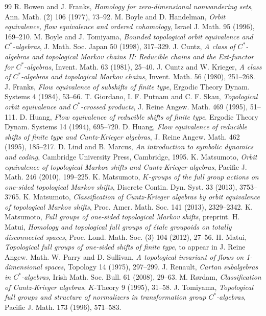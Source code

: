 \documentclass[11pt]{article}
\theoremstyle{definition}
\numberwithin{equation}{section}
\begin{document}
\begin{thebibliography}{99}
R. Bowen and J. Franks, 
\textit{Homology for zero-dimensional nonwandering sets}, 
Ann. Math. (2) 106 (1977), 73--92. 
M. Boyle and D. Handelman, 
\textit{Orbit equivalence, flow equivalence and ordered cohomology}, 
Israel J. Math. 95 (1996), 169--210. 
M. Boyle and J. Tomiyama, 
\textit{Bounded topological orbit equivalence and $C^*$-algebras}, 
J. Math. Soc. Japan 50 (1998), 317--329. 
J. Cuntz, 
\textit{A class of $C^*$-algebras and topological Markov chains II: 
Reducible chains and the Ext-functor for $C^*$-algebras}, 
Invent. Math. 63 (1981), 25--40. 
J. Cuntz and W. Krieger, 
\textit{A class of $C^*$-algebras and topological Markov chains}, 
Invent. Math. 56 (1980), 251--268. 
J. Franks, 
\textit{Flow equivalence of subshifts of finite type}, 
Ergodic Theory Dynam. Systems 4 (1984), 53--66. 
T. Giordano, I. F. Putnam and C. F. Skau, 
\textit{Topological orbit equivalence and $C^*$-crossed products}, 
J. Reine  Angew. Math. 469 (1995), 51--111. 
D. Huang, 
\textit{Flow equivalence of reducible shifts of finite type}, 
Ergodic Theory Dynam. Systems 14 (1994), 695--720. 
D. Huang, 
\textit{Flow equivalence of reducible shifts of finite type 
and Cuntz-Krieger algebras}, 
J. Reine Angew. Math. 462 (1995), 185--217. 
D. Lind and B. Marcus, 
\textit{An introduction to symbolic dynamics and coding}, 
Cambridge University Press, Cambridge, 1995. 
K. Matsumoto, 
\textit{Orbit equivalence of topological Markov shifts and 
Cuntz-Krieger algebras}, 
Pacific J. Math. 246  (2010), 199--225. 
K. Matsumoto, 
\textit{$K$-groups of the full group actions 
on one-sided topological Markov shifts}, 
Discrete Contin. Dyn. Syst. 33 (2013),  3753--3765. 
K. Matsumoto, 
\textit{Classification of Cuntz-Krieger algebras 
by orbit equivalence of topological Markov shifts}, 
Proc. Amer. Math. Soc. 141 (2013), 2329--2342. 
K. Matsumoto, 
\textit{Full groups of one-sided topological Markov shifts}, 
preprint. 
H. Matui, 
\textit{Homology and topological full groups of \'etale groupoids 
on totally disconnected spaces}, 
Proc. Lond. Math. Soc. (3) 104 (2012), 27--56. 
H. Matui, 
\textit{Topological full groups of one-sided shifts of finite type}, 
to appear in J. Reine Angew. Math. 
W. Parry and D. Sullivan, 
\textit{A topological invariant of flows on 1-dimensional spaces}, 
Topology 14 (1975), 297--299. 
J. Renault, 
\textit{Cartan subalgebras in $C^*$-algebras}, 
Irish Math. Soc. Bull. 61 (2008), 29--63. 
M. R\o rdam, 
\textit{Classification of Cuntz-Krieger algebras}, 
$K$-Theory 9 (1995), 31--58. 
J. Tomiyama, 
\textit{Topological full groups and structure of normalizers 
in transformation group $C^*$-algebras}, 
Pacific J. Math. 173 (1996), 571--583. 
\end{thebibliography}
\end{document}
